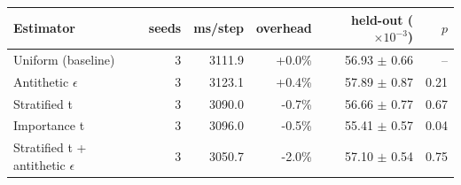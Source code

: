 \begin{tabular}{lrrrrr}
\toprule
Estimator & seeds & ms/step & overhead & held-out ($\times 10^{-3}$) & $p$ \\
\midrule
Uniform (baseline) & 3 & 3111.9 & +0.0\% & 56.93 $\pm$ 0.66 & -- \\
Antithetic $\epsilon$ & 3 & 3123.1 & +0.4\% & 57.89 $\pm$ 0.87 & 0.21 \\
Stratified t & 3 & 3090.0 & -0.7\% & 56.66 $\pm$ 0.77 & 0.67 \\
Importance t & 3 & 3096.0 & -0.5\% & 55.41 $\pm$ 0.57 & 0.04 \\
Stratified t + antithetic $\epsilon$ & 3 & 3050.7 & -2.0\% & 57.10 $\pm$ 0.54 & 0.75 \\
\bottomrule
\end{tabular}
